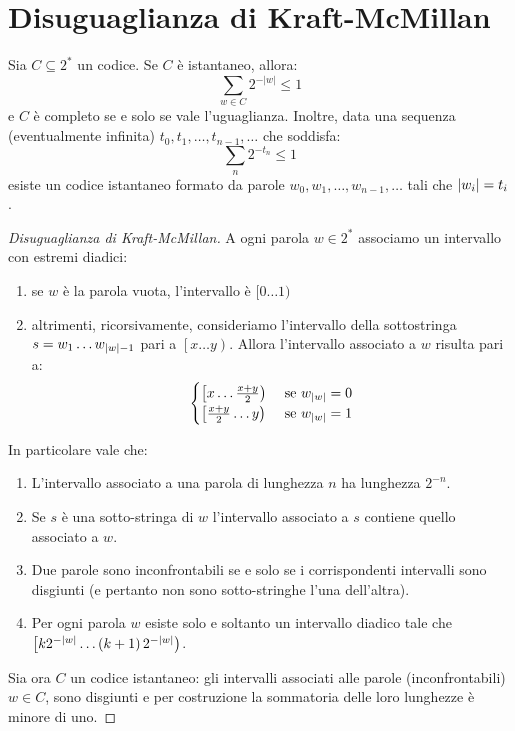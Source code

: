 \documentclass[\main/main.tex]{subfiles}
\begin{document}
\section{Disuguaglianza di Kraft-McMillan}
\begin{theorem}
    Sia \(C \subseteq 2^*\) un codice. Se \(C\) è istantaneo, allora:
    \[
        \sum_{w \in C} 2^{-|w|} \leq 1
    \]
    e \(C\) è completo se e solo se vale l'uguaglianza. Inoltre, data una sequenza (eventualmente infinita) \(t_{0}, t_{1}, \ldots, t_{n-1}, \dots\) che soddisfa:
    \[
        \sum_{n} 2^{-t_{n}} \leq 1
    \]
    esiste un codice istantaneo formato da parole \(w_{0}, w_{1}, \ldots, w_{n-1}, \ldots\) tali che \(\left\lvert w_i\right\rvert = t_i\).
\end{theorem}
\begin{proof}[Disuguaglianza di Kraft-McMillan]
    A ogni parola \(w \in 2^*\) associamo un intervallo con estremi diadici:
    \begin{enumerate}
        \item se \(w\) è la parola vuota, l'intervallo è \([0 \ldots 1)\)
        \item altrimenti, ricorsivamente, consideriamo l'intervallo della sottostringa \(s = w_1 \ldots w_{\left\lvert w\right\rvert-1}\) pari a \(\left[x \ldots y\right)\). Allora l'intervallo associato a \(w\) risulta pari a:
        \[
            \begin{cases}
                \left[x \ldots \frac{x+y}{2}\right) & \text{ se } w_{\left\lvert w\right\rvert} = 0\\
                \left[\frac{x+y}{2} \ldots y\right) & \text{ se } w_{\left\lvert w\right\rvert} = 1\\
            \end{cases}
        \]
    \end{enumerate}
    In particolare vale che:
    \begin{enumerate}
        \item L'intervallo associato a una parola di lunghezza \(n\) ha lunghezza \(2^{-n}\).
        \item Se \(s\) è una sotto-stringa di \(w\) l'intervallo associato a \(s\) contiene quello associato a \(w\).
        \item Due parole sono inconfrontabili se e solo se i corrispondenti intervalli sono disgiunti (e pertanto non sono sotto-stringhe l'una dell'altra).
        \item Per ogni parola \(w\) esiste solo e soltanto un intervallo diadico tale che \(\left[k2^{-\left\lvert w\right\rvert} \ldots \left(k+1\right)2^{-\left\lvert w\right\rvert}\right)\).
    \end{enumerate}
    Sia ora \(C\) un codice istantaneo: gli intervalli associati alle parole (inconfrontabili) \(w \in C\), sono disgiunti e per costruzione la sommatoria delle loro lunghezze è minore di uno.
    

\end{proof}
\end{document}
